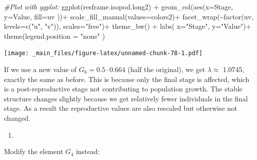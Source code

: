 \documentclass[
]{book}
\newenvironment{Shaded}{\begin{snugshade}}{\end{snugshade}}
\newcommand{\AttributeTok}[1]{\textcolor[rgb]{0.77,0.63,0.00}{#1}}
\newcommand{\CommentTok}[1]{\textcolor[rgb]{0.56,0.35,0.01}{\textit{#1}}}
\newcommand{\FunctionTok}[1]{\textcolor[rgb]{0.00,0.00,0.00}{#1}}
\newcommand{\NormalTok}[1]{#1}
\newcommand{\SpecialCharTok}[1]{\textcolor[rgb]{0.00,0.00,0.00}{#1}}
\newcommand{\StringTok}[1]{\textcolor[rgb]{0.31,0.60,0.02}{#1}}
\providecommand{\tightlist}{%
  \setlength{\itemsep}{0pt}\setlength{\parskip}{0pt}}
\begin{document}
\begin{Shaded}
\begin{Highlighting}[]
\CommentTok{\#Plot with ggplot:}
\FunctionTok{ggplot}\NormalTok{(resframe.isopod.long2) }\SpecialCharTok{+} 
  \FunctionTok{geom\_col}\NormalTok{(}\FunctionTok{aes}\NormalTok{(}\AttributeTok{x=}\NormalTok{Stage, }\AttributeTok{y=}\NormalTok{Value, }\AttributeTok{fill=}\NormalTok{uv ))}\SpecialCharTok{+}
  \FunctionTok{scale\_fill\_manual}\NormalTok{(}\AttributeTok{values=}\NormalTok{colors2)}\SpecialCharTok{+}
  \FunctionTok{facet\_wrap}\NormalTok{(}\SpecialCharTok{\textasciitilde{}}\FunctionTok{factor}\NormalTok{(uv, }\AttributeTok{levels=}\FunctionTok{c}\NormalTok{(}\StringTok{"u"}\NormalTok{, }\StringTok{"v"}\NormalTok{)), }
             \AttributeTok{scales=}\StringTok{"free"}\NormalTok{)}\SpecialCharTok{+}
  \FunctionTok{theme\_bw}\NormalTok{() }\SpecialCharTok{+}
  \FunctionTok{labs}\NormalTok{( }\AttributeTok{x=}\StringTok{"Stage"}\NormalTok{, }\AttributeTok{y=}\StringTok{"Value"}\NormalTok{)}\SpecialCharTok{+}
  \FunctionTok{theme}\NormalTok{(}\AttributeTok{legend.position =} \StringTok{"none"}\NormalTok{ ) }
\end{Highlighting}
\end{Shaded}

\texttt{[image: \_main\_files/figure-latex/unnamed-chunk-78-1.pdf]}

If we use a new value of \(G_6=0.5\cdot 0.664\) (half the original), we get \(\lambda\approx\) 1.0745, exactly the same as before. This is because only the final stage is affected, which is a post-reproductive stage not contributing to population growth. The stable structure changes slightly because we get relatively fewer individuals in the final stage. As a result the reproductive values are also rescaled but otherwise not changed.

\begin{enumerate}
\def\labelenumi{\arabic{enumi}.}
\setcounter{enumi}{4}
\tightlist
\item
\end{enumerate}

Modify the element \(G_4\) instead:
\end{document}
